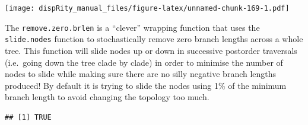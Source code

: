 \documentclass[
]{book}
\newenvironment{Shaded}{\begin{snugshade}}{\end{snugshade}}
\newcommand{\CommentTok}[1]{\textcolor[rgb]{0.56,0.35,0.01}{\textit{#1}}}
\newcommand{\DataTypeTok}[1]{\textcolor[rgb]{0.13,0.29,0.53}{#1}}
\newcommand{\DecValTok}[1]{\textcolor[rgb]{0.00,0.00,0.81}{#1}}
\newcommand{\KeywordTok}[1]{\textcolor[rgb]{0.13,0.29,0.53}{\textbf{#1}}}
\newcommand{\NormalTok}[1]{#1}
\newcommand{\OperatorTok}[1]{\textcolor[rgb]{0.81,0.36,0.00}{\textbf{#1}}}
\newcommand{\StringTok}[1]{\textcolor[rgb]{0.31,0.60,0.02}{#1}}
\begin{document}
\texttt{[image: dispRity\_manual\_files/figure-latex/unnamed-chunk-169-1.pdf]}

The \texttt{remove.zero.brlen} is a ``clever'' wrapping function that uses the \texttt{slide.nodes} function to stochastically remove zero branch lengths across a whole tree.
This function will slide nodes up or down in successive postorder traversals (i.e.~going down the tree clade by clade) in order to minimise the number of nodes to slide while making sure there are no silly negative branch lengths produced!
By default it is trying to slide the nodes using 1\% of the minimum branch length to avoid changing the topology too much.

\begin{Shaded}
\end{Shaded}

\begin{verbatim}
## [1] TRUE
\end{verbatim}

\begin{Shaded}
\end{Shaded}
\end{document}

